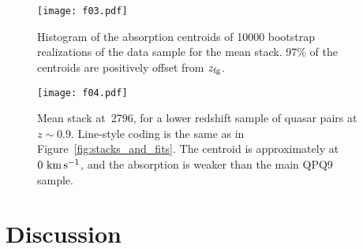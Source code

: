 \documentclass[iop]{emulateapj}
\begin{document}
\begin{figure}
\texttt{[image: f03.pdf]}
\caption{Histogram of the absorption centroids of 10000 bootstrap realizations of the data sample
for the  mean stack. 97\% of the centroids are positively offset from $z_{\rm fg}$.}
\label{fig:histogram_cen}
\end{figure}

\begin{figure}
\texttt{[image: f04.pdf]}
\caption{Mean stack at \,2796, for a lower redshift sample of quasar pairs at
$z\sim0.9$. Line-style coding is the same as in Figure~\ref{fig:stacks_and_fits}. The centroid is
approximately at $0\,{\rm \,km\,s^{-1}}$, and the absorption is weaker than the main QPQ9 sample.
}
\label{fig:stack_z1}
\end{figure}

\section{Discussion}
\label{sec:discussion}

\end{document}
